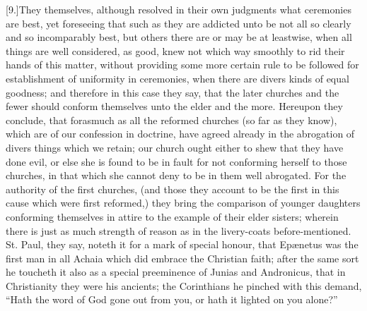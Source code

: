 [9.]They themselves, although resolved in their own judgments what ceremonies are best, yet foreseeing that such as they are addicted unto be not all so clearly and so incomparably best, but others there are or may be at leastwise, when all things are well considered, as good, knew not which way smoothly to rid their hands of this matter, without providing some more certain rule to be followed for establishment of uniformity in ceremonies, when there are divers kinds of equal goodness; and therefore in this case they say, that the later churches and the fewer should conform themselves unto the elder and the more. Hereupon they conclude, that forasmuch as all the reformed churches (so far as they know), which are of our confession in doctrine, have agreed already in the abrogation of divers things which we retain; our church ought either to shew that they have done evil, or else she is found to be in fault for not conforming herself to those churches, in that which she cannot deny to be in them well abrogated. For the authority of the first churches, (and those they account to be the first in this cause which were first reformed,) they bring the comparison of younger daughters conforming themselves in attire to the example of their elder sisters; wherein there is just as much strength of reason as in the livery-coats before-mentioned. St. Paul, they say, noteth it for a mark of special honour, that Epænetus was the first man in all Achaia which did embrace the Christian faith; after the same sort he toucheth it also as a special preeminence of Junias and Andronicus, that in Christianity they were his ancients; the Corinthians he pinched with this demand, “Hath the word of God gone out from you, or hath it lighted on you alone?”

